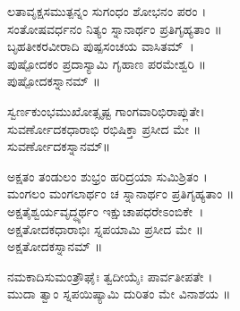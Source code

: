 ಲತಾವೃಕ್ಷಸಮುತ್ಪನ್ನಂ ಸುಗಂಧಂ ಶೋಭನಂ ಪರಂ ।\\
ಸಂತೋಷವರ್ಧನಂ ನಿತ್ಯಂ ಸ್ನಾನಾರ್ಥಂ ಪ್ರತಿಗೃಹ್ಯತಾಂ ॥ \\
ಬೃಹತೀಕರವೀರಾದಿ ಪುಷ್ಪಸಂಚಯ ವಾಸಿತಮ್~।\\ಪುಷ್ಪೋದಕಂ ಪ್ರದಾಸ್ಯಾಮಿ ಗೃಹಾಣ ಪರಮೇಶ್ವರಿ ॥\\
ಪುಷ್ಪೋದಕಸ್ನಾನಮ್ ॥

ಸ್ವರ್ಣಕುಂಭಮುಖೋತ್ಸೃಷ್ಟ ಗಾಂಗವಾರಿಭಿರಾಪ್ಲುತೇ।\\ ಸುವರ್ಣೋದಕಧಾರಾಭಿ ರಭಿಷಿಕ್ತಾ ಪ್ರಸೀದ ಮೇ ॥\\
ಸುವರ್ಣೋದಕಸ್ನಾನಮ್॥

ಅಕ್ಷತಂ ತಂಡುಲಂ ಶುಭ್ರಂ ಹರಿದ್ರಯಾ ಸುಮಿಶ್ರಿತಂ ।\\
ಮಂಗಲಂ ಮಂಗಲಾರ್ಥಂ ಚ ಸ್ನಾನಾರ್ಥಂ ಪ್ರತಿಗೃಹ್ಯತಾಂ ॥\\
ಅಕ್ಷತೈಶ್ವರ್ಯವೃದ್ಧ್ಯರ್ಥಂ ಇಕ್ಷುಚಾಪಧರೇಽಂಬಿಕೇ~।\\ಅಕ್ಷತೋದಕಧಾರಾಭಿಃ ಸ್ನಪಯಾಮಿ ಪ್ರಸೀದ ಮೇ ॥\\
 ಅಕ್ಷತೋದಕಸ್ನಾನಮ್ ॥

ನಮಕಾದಿಸುಮಂತ್ರೌಘೈಃ ತ್ವದೀಯೈಃ ಪಾರ್ವತೀಪತೇ ।\\
ಮುದಾ ತ್ವಾಂ ಸ್ನಪಯಿಷ್ಯಾಮಿ ದುರಿತಂ ಮೇ ವಿನಾಶಯ ॥

